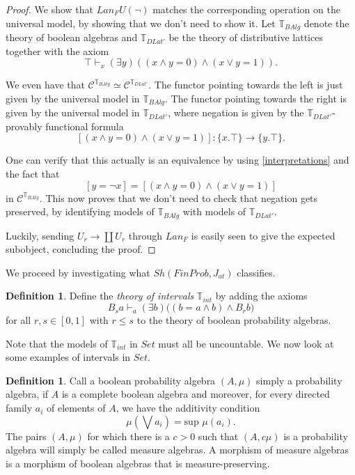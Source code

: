 \documentclass[a4paper]{amsproc}
\theoremstyle{plain}
\theoremstyle{definition}
\newtheorem{definition}[theorem]{Definition}
\theoremstyle{remark}
\numberwithin{equation}{section}
\begin{document}
\begin{proof}
We show that $Lan_F U(\neg)$ matches the corresponding operation on the universal model, by showing that we don't need to show it. Let $\mathbb{T}_{BAlg}$ denote the theory of boolean algebras and $\mathbb{T}_{DLat'}$ be the theory of distributive lattices together with the axiom
\[
\top \vdash_{x} (\exists y) ((x \wedge y=0)\wedge (x\vee y=1)) .
\]

We even have that $\mathcal{C}^{\mathbb{T}_{BAlg}} \simeq \mathcal{C}^{\mathbb{T}_{DLat'}}$. The functor pointing towards the left is just given by the universal model in $\mathbb{T}_{BAlg}$. The functor pointing towards the right is given by the universal model in $\mathbb{T}_{DLat'}$, where negation is given by the $\mathbb{T}_{DLat'}$-provably functional formula
\[
[(x\wedge y=0) \wedge (x\vee y=1)] : \{x.\top\} \to \{y.\top\}  .
\]

One can verify that this actually is an equivalence by using \ref{interpretations} and the fact that
\[
[y=\neg x] = [(x\wedge y=0) \wedge (x\vee y=1)] 
\]
in $\mathcal{C}^{\mathbb{T}_{BAlg}}$. This now proves that we don't need to check that negation gets preserved, by identifying models of $\mathbb{T}_{BAlg}$ with models of $\mathbb{T}_{DLat'}$.

Luckily, sending $U_r \to \coprod U_r$ through $Lan_F$ is easily seen to give the expected subobject, concluding the proof.
\end{proof}

We proceed by investigating what $Sh(FinProb, J_{at})$ classifies.

\begin{definition} \label{theory_of_intevals}
Define the \textit{theory of intervals} $\mathbb{T}_{int}$ by adding the axioms
\[
B_s a \vdash_a (\exists b) \big ( (b = a \wedge b) \wedge B_r b \big )
\]
for all $r,s \in [0,1]$ with $r \leq s$ to the theory of boolean probability algebras.
\end{definition}

Note that the models of $\mathbb{T}_{int}$ in $Set$ must all be uncountable. We now look at some examples of intervals in $Set$.

\begin{definition}
Call a boolean probability algebra $(A,\mu)$ simply a probability algebra, if $A$ is a complete boolean algebra and moreover, for every directed family $a_i$ of elements of $A$, we have the additivity condition
\[
\mu(\bigvee a_i) = \text{sup } \mu(a_i) .
\]
The pairs $(A,\mu)$ for which there is a $c > 0$ such that $(A, c \mu)$ is a probability algebra will simply be called measure algebras. A morphism of measure algebras is a morphism of boolean algebras that is measure-preserving.
\end{definition}
\end{document}
